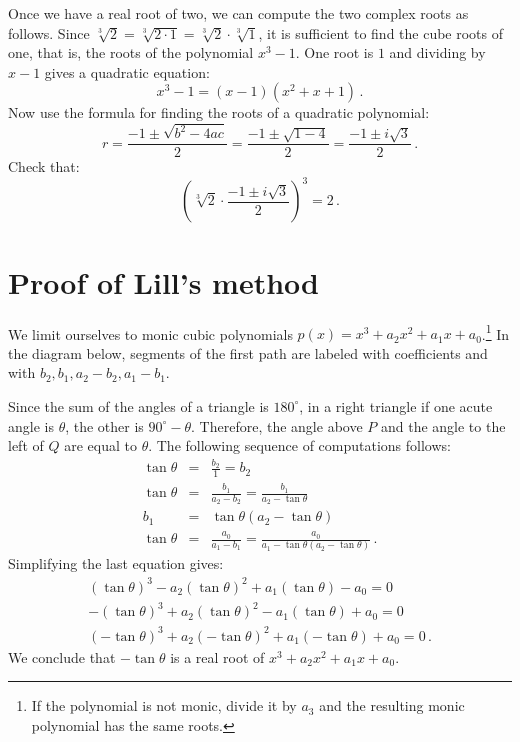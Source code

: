 \documentclass[11pt,a4paper]{article}
\newcommand*{\disfrac}[2]{\displaystyle\frac{#1}{#2}}
\newenvironment{form}[1]{%
\begin{displaymath}%
\renewcommand{\arraystretch}{#1}%
\begin{array}{lcl}}%
{\end{array}%
\end{displaymath}%
}
\begin{document}
Once we have a real root of two, we can compute the two complex roots as follows. Since $\sqrt[3]{2}=\sqrt[3]{2\cdot 1}=\sqrt[3]{2}\cdot\sqrt[3]{1}$, it is sufficient to find the cube roots of one, that is, the roots of the polynomial $x^3-1$. One root is $1$ and dividing by $x-1$ gives a quadratic equation:
\[
x^3-1=(x-1)(x^2+x+1)\,.
\]
Now use the formula for finding the roots of a quadratic polynomial:
\[
r=\disfrac{-1\pm\sqrt{b^2-4ac}}{2}=\disfrac{-1\pm\sqrt{1-4}}{2}=\disfrac{-1\pm i\sqrt{3}}{2}\,.
\]
Check that:
\[
\left(\sqrt[3]{2}\cdot \disfrac{-1\pm i\sqrt{3}}{2}\right)^3=2\,.
\]


\newpage

\section{Proof of Lill's method}\label{s.proof}

We limit ourselves to monic cubic polynomials $p(x)=x^3+a_2x^2+a_1x+a_0$.\footnote{If the polynomial is not monic, divide it by $a_3$ and the resulting monic polynomial has the same roots.} In the diagram below, segments of the first path are labeled with coefficients and with $b_2,b_1,a_2-b_2,a_1-b_1$.

Since the sum of the angles of a triangle is $180^\circ$, in a right triangle if one acute angle is $\theta$, the other is $90^\circ-\theta$. Therefore, the angle above $P$ and the angle to the left of $Q$ are equal to $\theta$. The following sequence of computations follows:
\begin{form}{1.5}
\tan \theta &=& \disfrac{b_2}{1}=b_2\\
\tan \theta &=& \disfrac{b_1}{a_2-b_2}=\disfrac{b_1}{a_2-\tan\theta}\\
b_1&=&\tan\theta (a_2-\tan\theta)\\
\tan \theta &=& \disfrac{a_0}{a_1-b_1}=\disfrac{a_0}{a_1-\tan\theta(a_2-\tan\theta)}\,.
\end{form}
Simplifying the last equation gives:
\begin{form}{1.2}
(\tan\theta)^3-a_2(\tan\theta)^2+a_1(\tan\theta)-a_0=0\\
-(\tan\theta)^3+a_2(\tan\theta)^2-a_1(\tan\theta)+a_0=0\\
(-\tan\theta)^3+a_2(-\tan\theta)^2+a_1(-\tan\theta)+a_0=0\,.
\end{form}
We conclude that $-\tan\theta$ is a real root of $x^3+a_2x^2+a_1x+a_0$.
\end{document}
